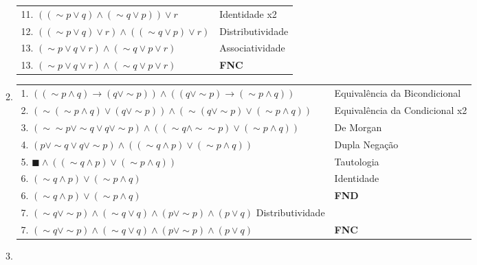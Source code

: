 \documentclass[12pt, a4paper,final]{article}
\begin{document}
\begin{enumerate}
\begin{enumerate}[label=(\alph*), leftmargin = 5mm]
\begin{tabular}{ll}
                11. $((\sim p \vee q) \wedge (\sim q \vee p)) \vee r$ & Identidade x2 \\
                12. $((\sim p \vee q) \vee r) \wedge ((\sim q \vee p) \vee r)$ & Distributividade \\
                13. $(\sim p \vee q \vee r) \wedge (\sim q \vee p \vee r)$ & Associatividade \\
                13. $(\sim p \vee q \vee r) \wedge (\sim q \vee p \vee r)$ & \textbf{FNC} \\
                \end{tabular}
            
            \item 
            
                \begin{tabular}{ll}
                    1. $((\sim p \wedge q) \rightarrow (q \vee \sim p)) \wedge ((q \vee \sim p) \rightarrow (\sim p \wedge q))$ & Equivalência da Bicondicional \\
                    2. $(\sim(\sim p \wedge q) \vee (q \vee \sim p)) \wedge (\sim (q \vee \sim p) \vee (\sim p \wedge q))$ & Equivalência da Condicional x2 \\
                    3. $(\sim \sim p \vee \sim q \vee q \vee \sim p) \wedge ((\sim q \wedge \sim \sim p) \vee (\sim p \wedge q))$ & De Morgan \\
                    4. $(p \vee \sim q \vee q \vee \sim p) \wedge ((\sim q \wedge p) \vee (\sim p \wedge q))$ & Dupla Negação \\
                    5. $\blacksquare \wedge ((\sim q \wedge p) \vee (\sim p \wedge q))$ & Tautologia \\
                    6. $(\sim q \wedge p) \vee (\sim p \wedge q)$ & Identidade \\
                    6. $(\sim q \wedge p) \vee (\sim p \wedge q)$ & \textbf{FND} \\
                    7. $(\sim q \vee \sim p) \wedge (\sim q \vee q) \wedge (p \vee \sim p) \wedge (p \vee q)$ Distributividade \\
                    7. $(\sim q \vee \sim p) \wedge (\sim q \vee q) \wedge (p \vee \sim p) \wedge (p \vee q)$ & \textbf{FNC} \\
                \end{tabular}
            
            \item 
            

\end{enumerate}
\end{enumerate}
\end{document}
